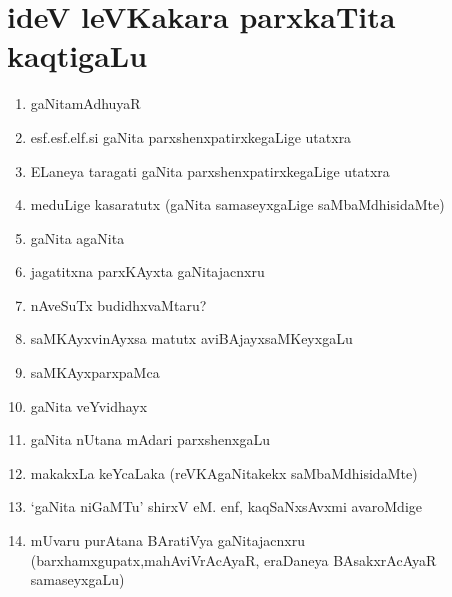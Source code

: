 \chapter{ideV leVKakara parxkaTita kaqtigaLu}

\begin{enumerate}
\renewcommand{\labelenumi}{\rm(\theenumi)}
\item gaNitamAdhuyaR
  
\item esf.esf.elf.si gaNita parxshenxpatirxkegaLige utatxra

\item ELaneya taragati gaNita parxshenxpatirxkegaLige utatxra

\item meduLige kasaratutx (gaNita samaseyxgaLige saMbaMdhisidaMte)

\item gaNita agaNita

\item jagatitxna parxKAyxta gaNitajacnxru

\item nAveSuTx budidhxvaMtaru?

\item saMKAyxvinAyxsa matutx aviBAjayxsaMKeyxgaLu 

\item saMKAyxparxpaMca

\item gaNita veYvidhayx

\item gaNita nUtana mAdari parxshenxgaLu

\item makakxLa keYcaLaka (reVKAgaNitakekx saMbaMdhisidaMte)

\item `gaNita niGaMTu' shirxV eM. enf, kaqSaNxsAvxmi avaroMdige  
  
\item mUvaru purAtana BAratiVya gaNitajacnxru (barxhamxgupatx,\break mahAviVrAcAyaR, eraDaneya BAsakxrAcAyaR samaseyxgaLu)
  
\end{enumerate}
